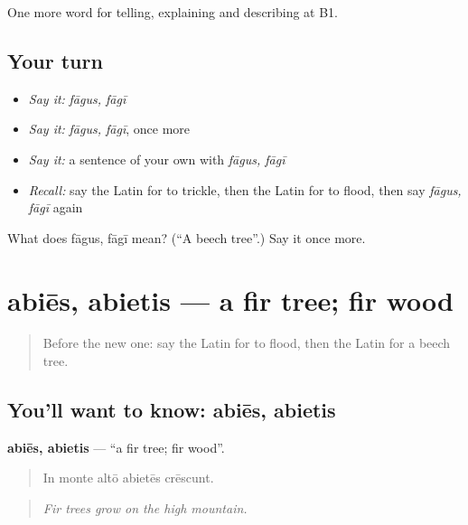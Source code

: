 \begin{grammarlens}[title={What you've built}]
One more word for telling, explaining and describing at B1.
\end{grammarlens}

\subsection*{Your turn}
\begin{itemize}
\raggedright
  \item \emph{Say it:} \emph{fāgus, fāgī}
  \item \emph{Say it:} \emph{fāgus, fāgī}, once more
  \item \emph{Say it:} a sentence of your own with \emph{fāgus, fāgī}
  \item \emph{Recall:} say the Latin for to trickle, then the Latin for to flood, then say \emph{fāgus, fāgī} again
\end{itemize}

\begin{tcolorbox}[breakable,colback=teal!4,colframe=teal!35!black,title={Before you move on}]
What does fāgus, fāgī mean? (\textquotedblleft{}A beech tree\textquotedblright{}.) Say it once more.
\end{tcolorbox}
\section[abiēs, abietis]{abiēs, abietis — a fir tree; fir wood}

\label{lesson:LA-C484-abies}



\begin{quote}
Before the new one: say the Latin for to flood, then the Latin for a beech tree.
\end{quote}

\subsection*{You'll want to know: abiēs, abietis}
\textbf{abiēs, abietis} — \textquotedblleft{}a fir tree; fir wood\textquotedblright{}.

\begin{quote}
In monte altō abietēs crēscunt.
\end{quote}

\begin{quote}
\emph{Fir trees grow on the high mountain.}
\end{quote}

